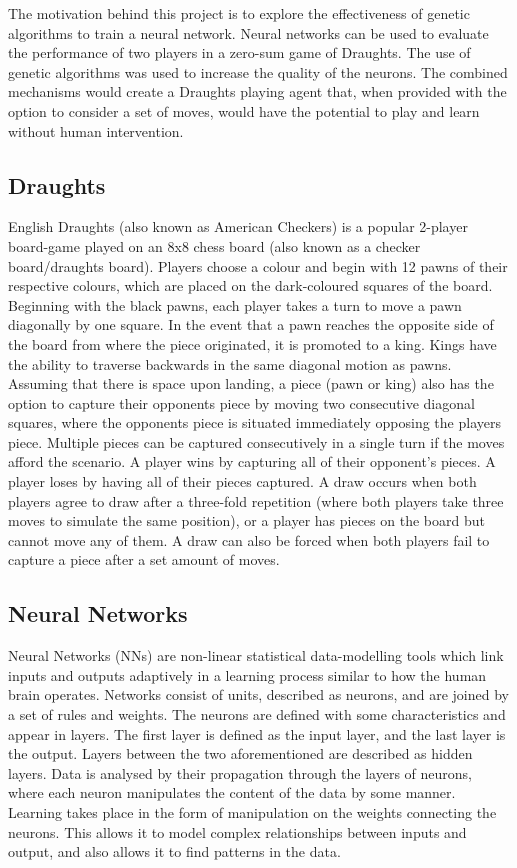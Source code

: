 \documentclass[12pt,a4paper]{article}
\begin{document}
    The motivation behind this project is to explore the effectiveness of genetic algorithms to train a neural network. Neural networks can be used to evaluate the performance of two players in a zero-sum game of Draughts. The use of genetic algorithms was used to increase the quality of the neurons. The combined mechanisms would create a Draughts playing agent that, when provided with the option to consider a set of moves, would have the potential to play and learn without human intervention.

    \subsection{Draughts}

    English Draughts (also known as American Checkers) is a popular 2-player board-game played on an 8x8 chess board (also known as a checker board/draughts board). Players choose a colour and begin with 12 pawns of their respective colours, which are placed on the dark-coloured squares of the board. Beginning with the black pawns, each player takes a turn to move a pawn diagonally by one square. In the event that a pawn reaches the opposite side of the board from where the piece originated, it is promoted to a king. Kings have the ability to traverse backwards in the same diagonal motion as pawns. Assuming that there is space upon landing, a piece (pawn or king) also has the option to capture their opponents piece by moving two consecutive diagonal squares, where the opponents piece is situated immediately opposing the players piece. Multiple pieces can be captured consecutively in a single turn if the moves afford the scenario. A player wins by capturing all of their opponent's pieces. A player loses by having all of their pieces captured. A draw occurs when both players agree to draw after a three-fold repetition (where both players take three moves to simulate the same position), or a player has pieces on the board but cannot move any of them. A draw can also be forced when both players fail to capture a piece after a set amount of moves.

    \subsection{Neural Networks}

    Neural Networks (NNs) are non-linear statistical data-modelling tools which link inputs and outputs adaptively in a learning process similar to how the human brain operates. Networks consist of units, described as neurons, and are joined by a set of rules and weights. The neurons are defined with some characteristics and appear in layers. The first layer is defined as the input layer, and the last layer is the output. Layers between the two aforementioned are described as hidden layers. Data is analysed by their propagation through the layers of neurons, where each neuron manipulates the content of the data by some manner. Learning takes place in the form of manipulation on the weights connecting the neurons. This allows it to model complex relationships between inputs and output, and also allows it to find patterns in the data. 
\end{document}
